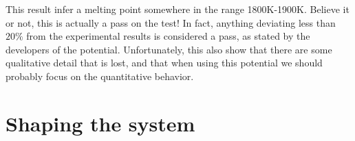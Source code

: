 \documentclass[twoside,english]{uiofysmaster}
\begin{document}
This result infer a melting point somewhere in the range 1800K-1900K. 
Believe it or not, this is actually a pass on the test! 
In fact, anything deviating less than $20\%$ from the experimental results is considered a pass, as stated by the developers of the potential. 
Unfortunately, this also show that there are some qualitative detail that is lost, and that when using this potential we should probably focus on the quantitative behavior. 





\section{Shaping the system}

\end{document}
